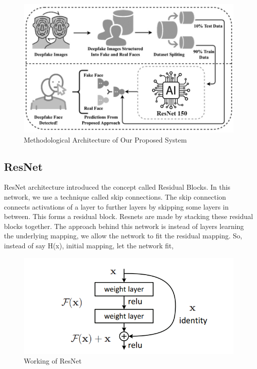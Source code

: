        \vspace{0.5in}
        \begin{figure}[hbt!]
            \centering
                \includegraphics[width=1\textwidth]{./img/implementation.jpg}
                \caption{Methodological Architecture of Our Proposed System}
        \end{figure}

        \subsection*{ResNet}
        ResNet architecture introduced the concept called Residual Blocks. In this network, we use a technique called skip connections. The skip connection connects activations of a  layer to further layers by skipping some layers in between. This forms a residual block. Resnets are made by stacking these residual blocks together. 
        The approach behind this network is instead of layers learning the underlying mapping, we allow the network to fit the residual mapping. So, instead of say H(x), initial mapping, let the network fit,

        \begin{figure}[hbt!]
            \centering
                \includegraphics[width=1\textwidth]{./img/ResNet.PNG}
                \caption{Working of ResNet}
        \end{figure}

